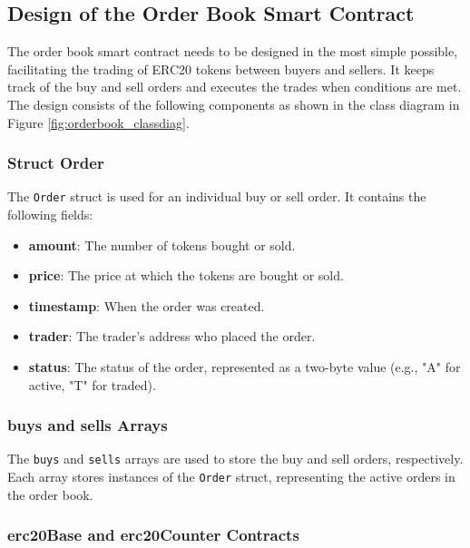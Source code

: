 \subsection{Design of the Order Book Smart Contract}

The order book smart contract needs to be designed in the most simple possible, facilitating the trading of ERC20 tokens between buyers and sellers. It
keeps track of the buy and sell orders and executes the trades when conditions are met. The design consists of the following components
as shown in the class diagram in Figure \ref{fig:orderbook_classdiag}.






\subsubsection{Struct Order}


The \texttt{Order} struct is used for an individual buy or sell order. It contains the following fields:
\begin{itemize}
    \item \textbf{amount}: The number of tokens bought or sold.
    \item \textbf{price}: The price at which the tokens are bought or sold.
    \item \textbf{timestamp}: When the order was created.
    \item \textbf{trader}: The trader's address who placed the order.
    \item \textbf{status}: The status of the order, represented as a two-byte value (e.g., "A" for active, "T" for traded).
\end{itemize}


\subsubsection{buys and sells Arrays}


The \texttt{buys} and \texttt{sells} arrays are used to store the buy and sell orders, respectively. Each array stores instances
of the \texttt{Order} struct, representing the active orders in the order book.


\subsubsection{erc20Base and erc20Counter Contracts}


